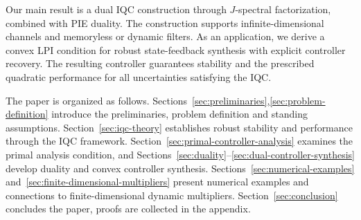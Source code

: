 Our main result is a dual IQC construction through $J$-spectral
factorization, combined with PIE duality. The construction supports
infinite-dimensional channels and memoryless or dynamic filters.
As an application, we derive a convex LPI condition for robust
state-feedback synthesis with explicit controller recovery. The resulting
controller guarantees stability and the prescribed quadratic performance
for all uncertainties satisfying the IQC.

The paper is organized as follows.
Sections~\ref{sec:preliminaries},\ref{sec:problem-definition} introduce the
preliminaries, problem definition and standing assumptions. Section~\ref{sec:iqc-theory}
establishes robust stability and performance through the IQC framework.
Section~\ref{sec:primal-controller-analysis} examines the primal
analysis condition, and
Sections~\ref{sec:duality}--\ref{sec:dual-controller-synthesis}
develop duality and convex controller synthesis.
Sections~\ref{sec:numerical-examples}
and~\ref{sec:finite-dimensional-multipliers} present numerical examples
and connections to finite-dimensional dynamic multipliers.
Section~\ref{sec:conclusion} concludes the paper, proofs are collected
in the appendix.
